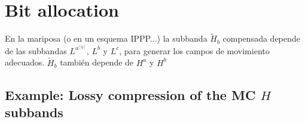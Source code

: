 




\section{Bit allocation}
En la mariposa (o en un esquema IPPP...) la subbanda $\tilde{H}_b$ compensada depende de las subbandas $L^a^{[q]}$, $L^b$ y $L^c$, para generar los campos de movimiento adecuados. $\tilde{H}_b$ también depende de $H^a$ y $H^b$ 

\subsection*{Example: Lossy compression of the MC $H$ subbands}

